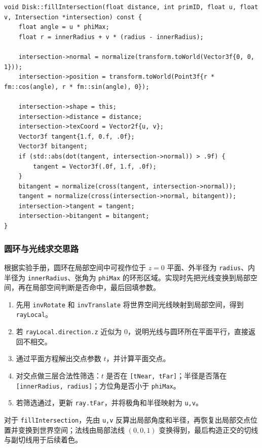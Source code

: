 \documentclass{article}
\begin{document}
\begin{lstlisting}[style=cppstyle]
void Disk::fillIntersection(float distance, int primID, float u, float v, Intersection *intersection) const {
    float angle = u * phiMax;
    float r = innerRadius + v * (radius - innerRadius);

    intersection->normal = normalize(transform.toWorld(Vector3f{0, 0, 1}));
    intersection->position = transform.toWorld(Point3f{r * fm::cos(angle), r * fm::sin(angle), 0});

    intersection->shape = this;
    intersection->distance = distance;
    intersection->texCoord = Vector2f{u, v};
    Vector3f tangent{1.f, 0.f, .0f};
    Vector3f bitangent;
    if (std::abs(dot(tangent, intersection->normal)) > .9f) {
        tangent = Vector3f(.0f, 1.f, .0f);
    }
    bitangent = normalize(cross(tangent, intersection->normal));
    tangent = normalize(cross(intersection->normal, bitangent));
    intersection->tangent = tangent;
    intersection->bitangent = bitangent;
}
\end{lstlisting}

\subsubsection{圆环与光线求交思路}

根据实验手册，圆环在局部空间中可视作位于 $z=0$ 平面、外半径为 \texttt{radius}、内半径为 \texttt{innerRadius}、张角为 \texttt{phiMax} 的环形区域。实现时先把光线变换到局部空间，再在局部空间判断是否命中，最后回填参数。

\begin{enumerate}
    \item 先用 \texttt{invRotate} 和 \texttt{invTranslate} 将世界空间光线映射到局部空间，得到 \texttt{rayLocal}。
    \item 若 \texttt{rayLocal.direction.z} 近似为 0，说明光线与圆环所在平面平行，直接返回不相交。
    \item 通过平面方程解出交点参数 $t$，并计算平面交点。
    \item 对交点做三层合法性筛选：$t$ 是否在 \texttt{[tNear, tFar]}；半径是否落在 \texttt{[innerRadius, radius]}；方位角是否小于 \texttt{phiMax}。
    \item 若筛选通过，更新 \texttt{ray.tFar}，并将极角和半径映射为 \texttt{u,v}。
\end{enumerate}

对于 \texttt{fillIntersection}，先由 \texttt{u,v} 反算出局部角度和半径，再恢复出局部交点位置并变换到世界空间；法线由局部法线 $(0,0,1)$ 变换得到，最后构造正交的切线与副切线用于后续着色。
\end{document}
